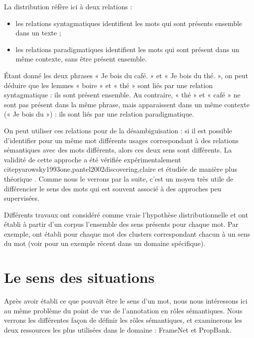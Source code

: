 La distribution réfère ici à deux relations \citep{sahlgren2008distributional}
:

\begin{itemize}

    \item les relations syntagmatiques identifient les mots qui sont présents
        ensemble dans un texte ;

    \item les relations paradigmatiques identifient les mots qui sont présent
        dans un même contexte, sans être présent ensemble.

\end{itemize}

Étant donné les deux phrases « Je bois du café. » et « Je bois du thé. », on
peut déduire que les lemmes « boire » et « thé » sont liés par une relation
syntagmatique : ils sont présent ensemble. Au contraire, « thé » et « café » ne
sont pas présent dans la même phrase, mais apparaissent dans un même contexte
(« Je bois du ») : ils sont liés par une relation paradigmatique.

On peut utiliser ces relations pour de la désambiguïsation : si il est possible
d'identifier pour un même mot différents usages correspondant à des relations
sémantiques avec des mots différents, alors ces deux sens sont différents. La
validité de cette approche a été vérifiée expérimentalement
citep{yarowsky1993one,pantel2002discovering,claire} et étudiée de manière plus
théorique \citep{sahlgren2006word,sahlgren2008distributional}. Comme nous le
verrons par la suite, c'est un moyen très utile de différencier le sens des
mots qui est souvent associé à des approches peu supervisées.

Différents travaux ont considéré comme vraie l'hypothèse distributionnelle et
ont établi à partir d'un corpus l'ensemble des sens présents pour chaque mot.
Par exemple,
\cite{schutze1998automatic,pantel2002discovering,niu2007three,pedersen2010duluth}
ont établi pour chaque mot des clusters correspondant chacun à un sens du mot
(voir \cite{liu2012semantic} pour un exemple récent dans un domaine
spécifique).

\section{Le sens des situations}
\label{senssituation}

Après avoir établi ce que pouvait être le sens d'un mot, nous nous intéressons
ici au même problème du point de vue de l'annotation en rôles sémantiques. Nous
verrons les différentes façon de définir les rôles sémantiques, et examinerons
les deux ressources les plus utilisées dans le domaine : FrameNet et PropBank.

